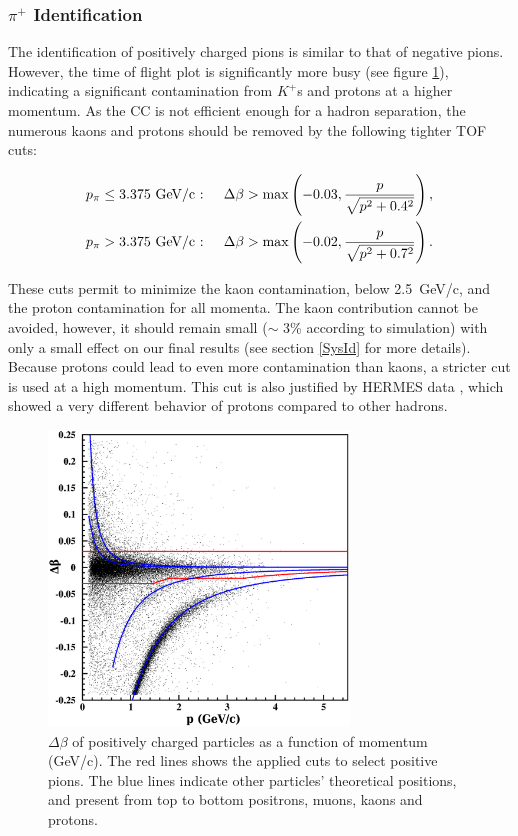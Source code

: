 \subsubsection{$\pi^+$ Identification}

The identification of positively charged pions is similar to that of negative 
pions. However, the time of flight plot is significantly more busy (see figure 
\ref{PipTOF}), indicating a significant contamination from $K^+$s and protons at a
higher momentum. As the CC is not efficient enough for a hadron separation, the 
numerous kaons and protons should be removed by the following tighter TOF cuts:

\begin{subequations}\label{TOF-Pip}
\begin{align}
    p_\pi &\leq 3.375 \text{ GeV/c : }
  & \Delta \beta &> \max\left(-0.03,{p \over\sqrt{p^2+0.4^2}}\right), \\ 
    p_\pi &> 3.375    \text{ GeV/c : }
  & \Delta \beta &> \max\left(-0.02,{p \over\sqrt{p^2+0.7^2}}\right).
\end{align}
\end{subequations}

These cuts permit to minimize the kaon contamination, below 2.5~GeV/c, and the 
proton contamination for all momenta. The kaon contribution cannot be avoided, however, it should remain small ($\sim$ 3\% according to simulation) 
with only a small effect on our final results (see section \ref{SysId} 
for more details). Because protons could lead to even more contamination than kaons, 
a stricter cut is used at a high momentum. This cut is also justified by 
HERMES data \cite{Airapetian:2007vu}, which showed a very different behavior of protons compared to other hadrons.

\begin{figure}[tbp]
\centering
\includegraphics[width=8cm] {chap5-fig/pip_data.png} 
\caption {$\Delta \beta$ of positively charged particles as a function of momentum (GeV/c). The red lines shows the applied cuts to select positive pions. The blue lines indicate other particles' theoretical positions, and present from top to 
bottom positrons, muons, kaons and protons.}
\label{PipTOF}
\end{figure}

